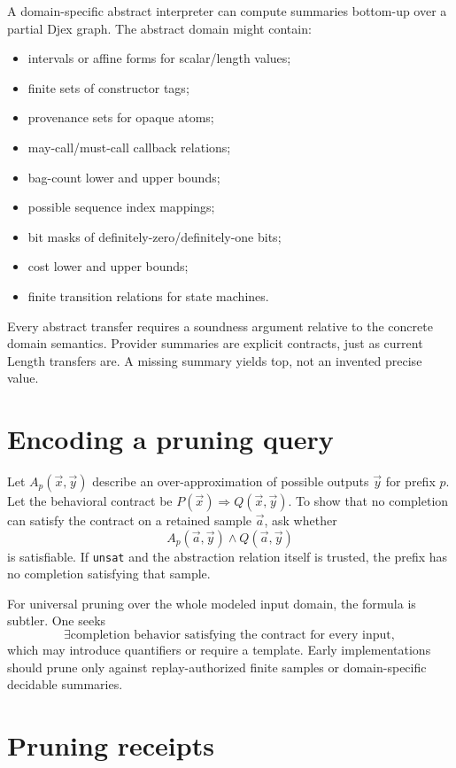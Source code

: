 \documentclass[10pt,letterpaper,oneside]{report}
\newcommand{\unsat}{\texttt{unsat}}
\begin{document}
A domain-specific abstract interpreter can compute summaries bottom-up over a partial Djex graph. The abstract domain might contain:

\begin{itemize}
\item intervals or affine forms for scalar/length values;
\item finite sets of constructor tags;
\item provenance sets for opaque atoms;
\item may-call/must-call callback relations;
\item bag-count lower and upper bounds;
\item possible sequence index mappings;
\item bit masks of definitely-zero/definitely-one bits;
\item cost lower and upper bounds;
\item finite transition relations for state machines.
\end{itemize}

Every abstract transfer requires a soundness argument relative to the concrete domain semantics. Provider summaries are explicit contracts, just as current Length transfers are. A missing summary yields top, not an invented precise value.

\section{Encoding a pruning query}

Let $A_p(\vec x,\vec y)$ describe an over-approximation of possible outputs $\vec y$ for prefix $p$. Let the behavioral contract be $P(\vec x)\Rightarrow Q(\vec x,\vec y)$. To show that no completion can satisfy the contract on a retained sample $\vec a$, ask whether
\[
  A_p(\vec a,\vec y)\land Q(\vec a,\vec y)
\]
is satisfiable. If \unsat{} and the abstraction relation itself is trusted, the prefix has no completion satisfying that sample.

For universal pruning over the whole modeled input domain, the formula is subtler. One seeks
\[
  \exists \text{completion behavior satisfying the contract for every input},
\]
which may introduce quantifiers or require a template. Early implementations should prune only against replay-authorized finite samples or domain-specific decidable summaries.

\section{Pruning receipts}
\end{document}
